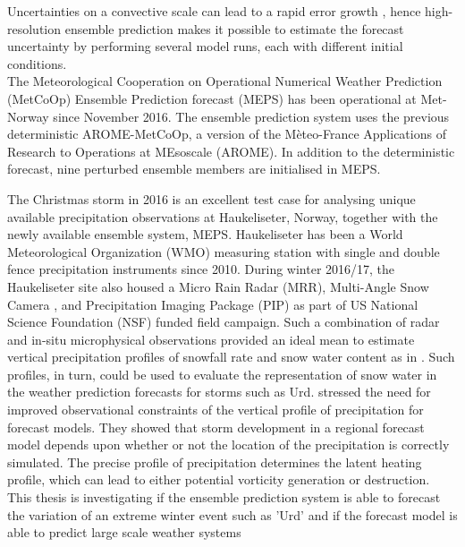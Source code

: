 Uncertainties on a convective scale can lead to a rapid error growth \citep{lorenz_atmospheric_1969}, hence high-resolution ensemble prediction makes it possible to estimate the forecast uncertainty by performing several model runs, each with different initial conditions. %
\\
The Meteorological Cooperation on Operational Numerical Weather Prediction (MetCoOp) Ensemble Prediction forecast (MEPS) has been operational at Met-Norway since November 2016. The ensemble prediction system uses the previous deterministic AROME-MetCoOp, a version of the Mèteo-France Applications of Research to Operations at MEsoscale (AROME). In addition to the deterministic forecast, nine perturbed ensemble members are initialised in MEPS. 
\par\medskip
\noindent
The Christmas storm in 2016 is an excellent test case for analysing unique available precipitation observations at Haukeliseter, Norway, together with the newly available ensemble system, MEPS.
Haukeliseter has been a World Meteorological Organization (WMO) measuring station with single and double fence precipitation instruments since 2010. During winter 2016/17, the Haukeliseter site also housed a Micro Rain Radar (MRR), Multi-Angle Snow Camera \citep[MASC;][]{garrett_fall_2012}, and Precipitation Imaging Package (PIP) as part of US National Science Foundation (NSF) funded field campaign. Such a combination of radar and in-situ microphysical observations provided an ideal mean to estimate vertical precipitation profiles of snowfall rate and snow water content as in \citet{cooper_variational_2017}. Such profiles, in turn, could be used to evaluate the representation of snow water in the weather prediction forecasts for storms such as Urd. \citet{joos_influence_2012} stressed the need for improved observational constraints of the vertical profile of precipitation for forecast models. They showed that storm development in a regional forecast model depends upon whether or not the location of the precipitation is correctly simulated.  The precise profile of precipitation determines the latent heating profile, which can lead to either potential vorticity generation or destruction. 
\\
This thesis is investigating if the ensemble prediction system is able to forecast the variation of an extreme winter event such as 'Urd' and if the forecast model is able to predict large scale weather systems %
